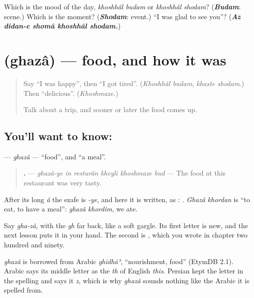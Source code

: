 \begin{tcolorbox}[breakable,colback=teal!4,colframe=teal!35!black,title={Before you move on}]
Which is the mood of the day, \emph{khoshhâl budam} or \emph{khoshhâl shodam}? (\emph{\textbf{Budam}}: scene.) Which is the moment? (\emph{\textbf{Shodam}}: event.) \textquotedblleft{}I was glad to see you\textquotedblright{}? (\emph{\textbf{Az didan-e shomâ khoshhâl shodam.}})
\end{tcolorbox}
\section[\texorpdfstring{\fa{غذا} (ghazâ)}{غذا (ghazâ)}]{ (ghazâ) — food, and how it was}

\label{lesson:FA-C296-ghaza}



\begin{quote}
Say \textquotedblleft{}I was happy\textquotedblright{}, then \textquotedblleft{}I got tired\textquotedblright{}. (\emph{Khoshhâl budam}, \emph{khaste shodam}.) Then \textquotedblleft{}delicious\textquotedblright{}. (\emph{Khoshmaze.})

Talk about a trip, and sooner or later the food comes up.
\end{quote}

\subsection*{You'll want to know: }
\textbf{} — \emph{ghazâ} — \textquotedblleft{}food\textquotedblright{}, and \textquotedblleft{}a meal\textquotedblright{}.

\begin{quote}
\textbf{     .} — \emph{ghazâ-ye in resturân kheyli khoshmaze bud} — The food at this restaurant was very tasty.
\end{quote}

After its long \emph{â} the ezafe is \emph{-ye}, and here it is written, as \textbf{}: \textbf{}. \emph{Ghazâ khordan} is \textquotedblleft{}to eat, to have a meal\textquotedblright{}: \emph{ghazâ khordim}, we ate.

Say \emph{gha-zâ}, with the \emph{gh} far back, like a soft gargle. Its first letter is new, and the next lesson puts it in your hand. The second is \textbf{}, which you wrote in chapter two hundred and ninety.

\begin{cousinweb}
\emph{ghazâ} is borrowed from Arabic \emph{ghidhāʾ}, \textquotedblleft{}nourishment, food\textquotedblright{} (EtymDB 2.1). Arabic says its middle letter as the \emph{th} of English \emph{this}. Persian kept the letter \textbf{} in the spelling and says it \emph{z}, which is why \emph{ghazâ} sounds nothing like the Arabic it is spelled from.
\end{cousinweb}

